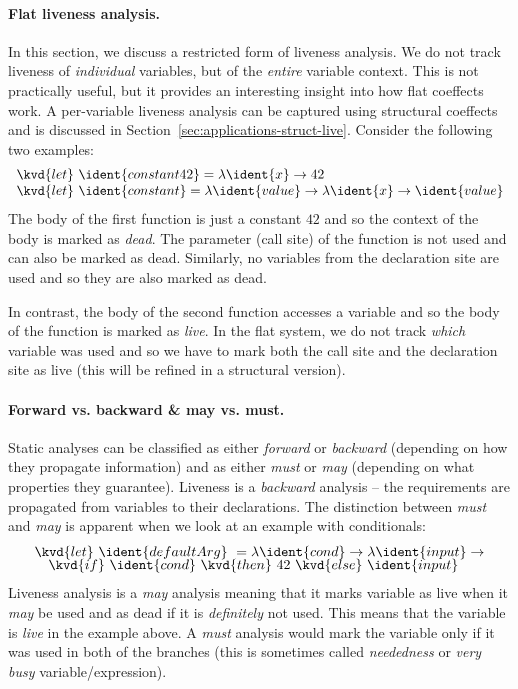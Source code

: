 \paragraph{Flat liveness analysis.}
In this section, we discuss a restricted form of liveness analysis. We do not track liveness of
\emph{individual} variables, but of the \emph{entire} variable context. This is not practically
useful, but it provides an interesting insight into how flat coeffects work. A per-variable liveness
analysis can be captured using structural coeffects and is discussed in Section~\ref{sec:applications-struct-live}.
Consider the following two examples:
%
\begin{equation*}
\begin{array}{l}
\kvd{let}~\ident{constant42} = \lambda \ident{x} \rightarrow 42\\
\kvd{let}~\ident{constant} = \lambda \ident{value} \rightarrow \lambda \ident{x} \rightarrow \ident{value}
\end{array}
\end{equation*}
%
The body of the first function is just a constant $42$ and so the context of the body is marked
as \emph{dead}. The parameter (call site) of the function is not used and can also be marked as dead.
Similarly, no variables from the declaration site are used and so they are also marked as dead.

In contrast, the body of the second function accesses a variable  and so the body
of the function is marked as \emph{live}. In the flat system, we do not track \emph{which}
variable was used and so we have to mark both the call site and the declaration site as live (this will
be refined in a structural version).

\paragraph{Forward vs. backward \& may vs. must.}
Static analyses can be classified as either \emph{forward} or \emph{backward} (depending on how they
propagate information) and as either \emph{must} or \emph{may} (depending on what properties they
guarantee). Liveness is a \emph{backward} analysis -- the requirements are propagated from variables
to their declarations. The distinction between \emph{must} and \emph{may} is apparent when we look
at an example with conditionals:
%
\begin{equation*}
\begin{array}{l}
\kvd{let}~\ident{defaultArg}~= \lambda \ident{cond} \rightarrow \lambda \ident{input} \rightarrow\\[-0.25em]
\quad\kvd{if}~\ident{cond}~\kvd{then}~42~\kvd{else}~\ident{input}
\end{array}
\end{equation*}
%
Liveness analysis is a \emph{may} analysis meaning that it marks variable as live when it
\emph{may} be used and as dead if it is \emph{definitely} not used. This means that the variable
 is \emph{live} in the example above. A \emph{must} analysis would mark the variable
only if it was used in both of the branches (this is sometimes called \emph{neededness} or
\emph{very busy} variable/expression).

